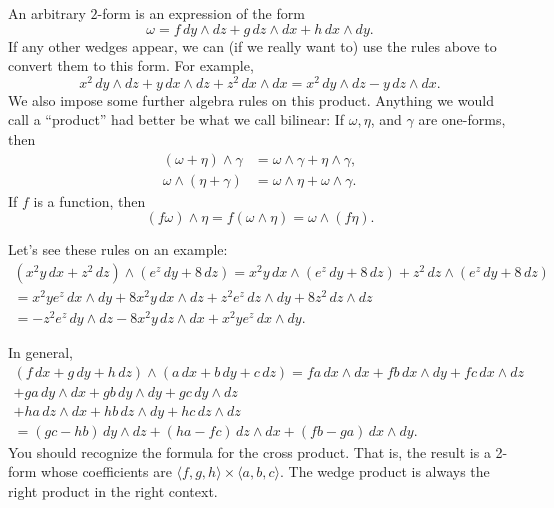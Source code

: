 \documentclass[12pt]{article}
\begin{document}
An arbitrary $2$-form is an expression of the form
\[
\omega = 
f\, dy \wedge dz + 
g\, dz \wedge dx +
h\, dx \wedge dy .
\]
If any other wedges appear, we can (if we really want to)
use the rules above to convert them to this
form.  For example,
\[
x^2 \, dy \wedge dz + 
y \, dx \wedge dz +
z^2\, dx \wedge dx 
=
x^2 \, dy \wedge dz - y \, dz \wedge dx .
\]
We also impose some further algebra rules on this product.  Anything we would
call a ``product'' had better be
what we call bilinear:  If $\omega, \eta$, and $\gamma$ are one-forms, then
\begin{align*}
(\omega + \eta) \wedge \gamma
& =
\omega \wedge \gamma
+
\eta \wedge \gamma ,
\\
\omega \wedge (\eta + \gamma)
& =
\omega \wedge \eta
+
\omega \wedge \gamma .
\end{align*}
If $f$ is a function, then
\begin{equation*}
(f \omega) \wedge \eta =
f (\omega \wedge \eta) =
\omega \wedge ( f \eta) .
\end{equation*}

Let's see these rules on an example:
\begin{multline*}
( x^2 y \, dx + z^2 \, dz) \wedge (e^z \, dy + 8 \, dz)
=
x^2 y \, dx \wedge (e^z \, dy + 8 \, dz)
+
z^2 \, dz \wedge (e^z \, dy + 8 \, dz)
\\
=
x^2 y e^z \, dx \wedge dy
+
8 x^2 y \, dx \wedge dz
+
z^2 e^z \, dz \wedge dy
+
8 z^2 \, dz \wedge dz
\\
=
- z^2 e^z \, dy \wedge dz
-
8 x^2 y \, dz \wedge dx
+
x^2 y e^z \, dx \wedge dy .
\end{multline*}

In general,
\begin{multline*}
(f\, dx + g\, dy + h \, dz) \wedge
(a\, dx + b\, dy + c \, dz)
=
fa\, dx \wedge dx +
fb\, dx \wedge dy +
fc\, dx \wedge dz
\\
+
ga\, dy \wedge dx +
gb\, dy \wedge dy +
gc\, dy \wedge dz 
\\
+
ha\, dz \wedge dx +
hb\, dz \wedge dy +
hc\, dz \wedge dz
\\
=
(gc-hb)\, dy \wedge dz +
(ha-fc)\, dz \wedge dx +
(fb-ga) \, dx \wedge dy .
\end{multline*}
You should recognize the formula for the cross product.  That is,
the result is a 2-form whose coefficients are
$\langle f,g,h \rangle \times
\langle a,b,c \rangle$.
The wedge product
is always the right product in the right context.
\end{document}
